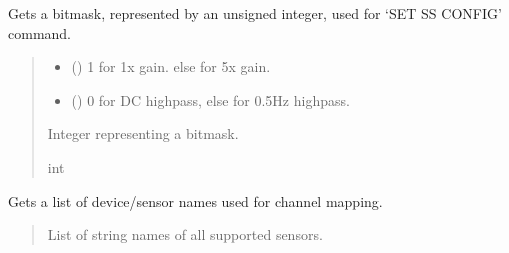 \documentclass[letterpaper,10pt,english]{sphinxmanual}
\begin{document}
\begin{fulllineitems}
\begin{fulllineitems}
\label{\detokenize{PodApi.Devices:PodApi.Devices.PodDevice_8401HR.Pod8401HR.GetSSConfigBitmask}}
\pysigstartsignatures
{}
\pysigstopsignatures
\sphinxAtStartPar
Gets a bitmask, represented by an unsigned integer, used for ‘SET SS CONFIG’ command.
\begin{quote}\begin{description}
\begin{itemize}
\item {} 
\sphinxAtStartPar
{} () \textendash{} 1 for 1x gain. else for 5x gain.

\item {} 
\sphinxAtStartPar
{} () \textendash{} 0 for DC highpass, else for 0.5Hz highpass.

\end{itemize}

\sphinxAtStartPar
Integer representing a bitmask.

\sphinxAtStartPar
int

\end{description}\end{quote}

\end{fulllineitems}


\begin{fulllineitems}
\label{\detokenize{PodApi.Devices:PodApi.Devices.PodDevice_8401HR.Pod8401HR.GetSupportedPreampDevices}}
\pysigstartsignatures
{}
\pysigstopsignatures
\sphinxAtStartPar
Gets a list of device/sensor names used for channel mapping.
\begin{quote}\begin{description}
\sphinxAtStartPar
List of string names of all supported sensors.


\end{description}
\end{quote}
\end{fulllineitems}
\end{fulllineitems}
\end{document}
